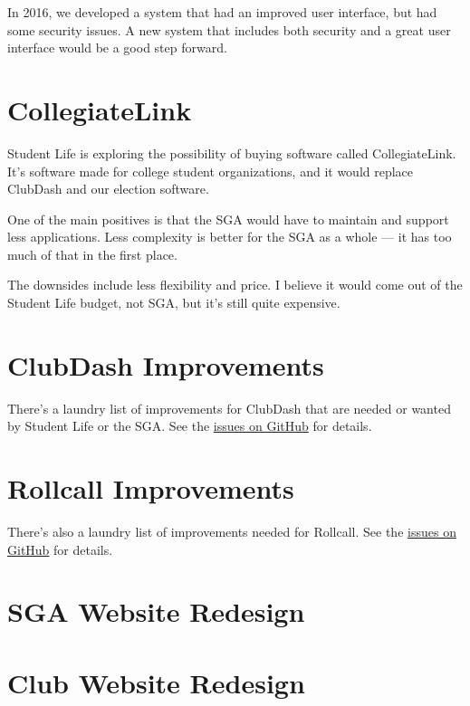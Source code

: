 \documentclass[11pt]{report}
\begin{document}
		In 2016, we developed a system that had an improved user interface, but had some security issues. A new system that includes both security and a great user interface would be a good step forward.
	
	\section{CollegiateLink}
		Student Life is exploring the possibility of buying software called CollegiateLink. It's software made for college student organizations, and it would replace ClubDash and our election software.
		
		One of the main positives is that the SGA would have to maintain and support less applications. Less complexity is better for the SGA as a whole --- it has too much of that in the first place.
		
		The downsides include less flexibility and price. I believe it would come out of the Student Life budget, not SGA, but it's still quite expensive.
	
	\section{ClubDash Improvements}
		There's a laundry list of improvements for ClubDash that are needed or wanted by Student Life or the SGA. See the \href{https://github.com/marist-sga/clubdash/issues}{issues on GitHub} for details.
	
	\section{Rollcall Improvements}
		There's also a laundry list of improvements needed for Rollcall. See the \href{https://github.com/marist-sga/rollcall/issues}{issues on GitHub} for details.
	
	\section{SGA Website Redesign}
	
	\section{Club Website Redesign}
\end{document}
